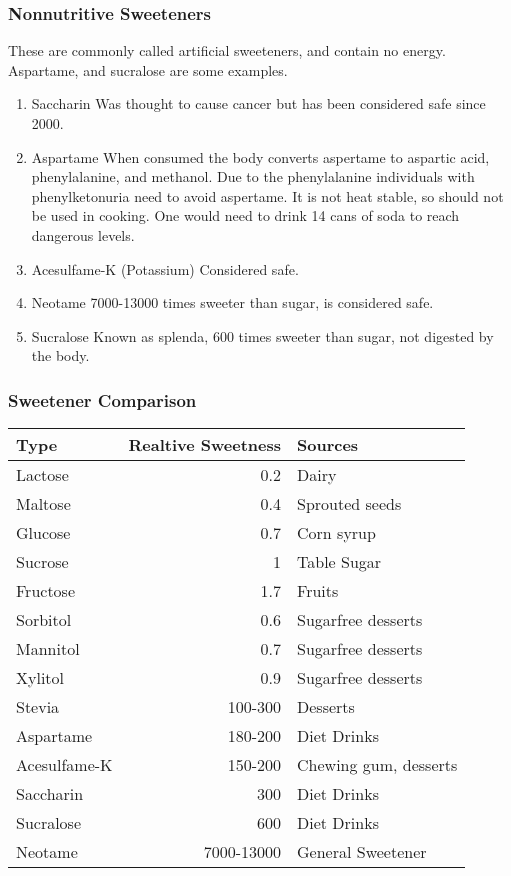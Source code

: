 \documentclass[letterpaper, 11pt]{article}
\begin{document}
\subsubsection{Nonnutritive Sweeteners}
\label{sec:org7396d3a}
These are commonly called artificial sweeteners, and contain no energy. Aspartame, and sucralose are some examples.\\
\begin{enumerate}
\item Saccharin
\label{sec:org7c73108}
Was thought to cause cancer but has been considered safe since 2000.\\
\item Aspartame
\label{sec:org4420818}
When consumed the body converts aspertame to aspartic acid, phenylalanine, and methanol. Due to the phenylalanine individuals with phenylketonuria need to avoid aspertame. It is not heat stable, so should not be used in cooking. One would need to drink 14 cans of soda to reach dangerous levels.\\
\item Acesulfame-K (Potassium)
\label{sec:orgb048f84}
Considered safe.\\
\item Neotame
\label{sec:orgf306fb0}
7000-13000 times sweeter than sugar, is considered safe.\\
\item Sucralose
\label{sec:org86f4dd7}
Known as splenda, 600 times sweeter than sugar, not digested by the body.\\
\end{enumerate}
\subsubsection{Sweetener Comparison}
\label{sec:org18b0ad0}
\begin{center}
\begin{tabular}{lrl}
Type & Realtive Sweetness & Sources\\
\hline
Lactose & 0.2 & Dairy\\
Maltose & 0.4 & Sprouted seeds\\
Glucose & 0.7 & Corn syrup\\
Sucrose & 1 & Table Sugar\\
Fructose & 1.7 & Fruits\\
Sorbitol & 0.6 & Sugarfree desserts\\
Mannitol & 0.7 & Sugarfree desserts\\
Xylitol & 0.9 & Sugarfree desserts\\
Stevia & 100-300 & Desserts\\
Aspartame & 180-200 & Diet Drinks\\
Acesulfame-K & 150-200 & Chewing gum, desserts\\
Saccharin & 300 & Diet Drinks\\
Sucralose & 600 & Diet Drinks\\
Neotame & 7000-13000 & General Sweetener\\
\end{tabular}
\end{center}
\end{document}
